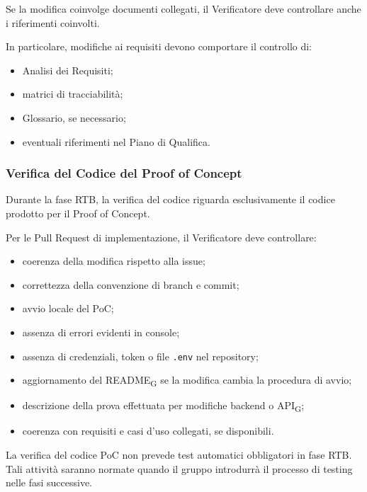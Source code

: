 Se la modifica coinvolge documenti collegati, il Verificatore deve controllare
anche i riferimenti coinvolti.

In particolare, modifiche ai requisiti devono comportare il controllo di:

\begin{itemize}
    \item Analisi dei Requisiti;
    \item matrici di tracciabilità;
    \item Glossario, se necessario;
    \item eventuali riferimenti nel Piano di Qualifica.
\end{itemize}


\subsubsection{Verifica del Codice del Proof of Concept}

Durante la fase RTB, la verifica del codice riguarda esclusivamente il codice
prodotto per il Proof of Concept.

Per le Pull Request di implementazione, il Verificatore deve controllare:

\begin{itemize}
    \item coerenza della modifica rispetto alla issue;
    \item correttezza della convenzione di branch e commit;
    \item avvio locale del PoC;
    \item assenza di errori evidenti in console;
    \item assenza di credenziali, token o file \texttt{.env} nel repository;
    \item aggiornamento del README\textsubscript{G} se la modifica cambia la procedura di avvio;
    \item descrizione della prova effettuata per modifiche backend o API\textsubscript{G};
    \item coerenza con requisiti e casi d'uso collegati, se disponibili.
\end{itemize}

La verifica del codice PoC non prevede test automatici obbligatori in fase RTB.
Tali attività saranno normate quando il gruppo introdurrà il processo di testing
nelle fasi successive.


